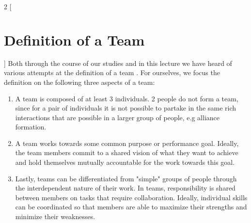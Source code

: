 \begin{multicols}{2}
[\section{Definition of a Team}]
Both through the course of our studies and in this lecture we have heard of various attempts at the definition of a team \cite{katzenbach2003the,BuildingBlocks,Hoelzle}. 
For ourselves, we focus the definition on the following three aspects of a team:

  \begin{enumerate}[1.]
	\item A team is composed of at least 3 individuals. 2 people do not form a team, since for a pair of individuals it is not possible to partake in the same rich interactions that are possible in a larger group of people, e.g alliance formation.
	\item A team works towards some common purpose or performance goal. Ideally, the team members commit to a shared vision of what they want to achieve and hold themselves mutually accountable for the work towards this goal.
	\item Lastly, teams can be differentiated from "simple" groups of people through the interdependent nature of their work. In teams, responsibility is shared between members on tasks that require collaboration. Ideally, individual skills can be coordinated so that members are able to maximize their strengths and minimize their weaknesses.
  \end{enumerate}
\end{multicols}